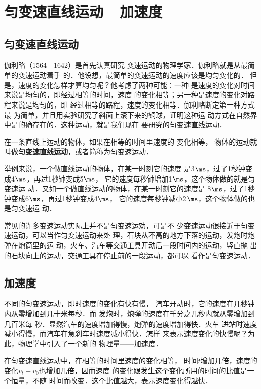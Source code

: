 \section{匀变速直线运动~~加速度}
    \subsection{匀变速直线运动}
    
    伽利略（1564—1642）是首先认真研究
变速运动的物理学家．伽利略就是从最简单的变速运动着手
的．他设想，最简单的变速运动的速度应该是均匀变化的．
但是，速度的变化怎样才算均匀呢？他考虑了两种可能：一种
是速度的变化对时间来说是均匀的，即经过相等的时间，速度
的变化相等；另一种是速度的变化对路程来说是均匀的，即
经过相等的路程，速度的变化相等．伽利略断定第一种方式最
为简单，并且用实验研究了斜面上滚下来的铜球，证明这种运
动方式在自然界中是的确存在的．这种运动，就是我们现在
要研究的匀变速直线运动．

在一条直线上运动的物体，如果在相等的时间里速度的
变化相等，
物体的运动就叫做\textbf{匀变速直线运动}，或者简称为匀变速运动．

举例来说，一个做直线运动的物体，在某一时刻它的速度
是3$\ms$，过了1秒钟变成4$\ms$，再过1秒钟变成5$\ms$，
它的速度每秒钟增加1$\ms$，这个物体做的就是匀变速运
动．又如一个做直线运动的物体，在某一时刻它的速度是
8$\ms$，过了1秒钟变成6$\ms$，再过1秒钟变成4$\ms$，
它的速度每秒钟减小2$\ms$，这个物体做的也是匀变速运
动．

    常见的许多变速运动实际上并不是匀变速运劝，可是不
少变速运动很接近于匀变速运动，可以当作匀变速运动来处
理，石块从不高的地方下落的运动，发炮时炮弹在炮筒里的运
动，火车、汽车等交通工具开动后一段时间内的运动，竖直抛
出的石块向上的运动，交通工具在停止前的一段运动，都可以
看作是匀变速运动．

\subsection{加速度}
不同的匀变速运动，即时速度的变化有快有慢，
汽车开动时，它的速度在几秒钟内从零增加到几十米每秒．而
发炮时，炮弹的速度在千分之几秒内就从零增加到几百米每
秒．显然汽车的速度增加得慢，炮弹的速度增加得快．火车
进站时速度减小得慢，而汽车在急刹车时速度减小得快．怎样
来表示速度变化的快慢呢？为此，物理学中引入了一个新的
物理量——加速度．

在匀变速直线运动中，在相等的时间里速度的变化相等，
时间$t$增加几倍，速度的变化$v_t-v_0$也增加几倍，因而速度
的变化跟发生这个变化所用的时间的比值是一个恒量，不随
时间而改变．这个比值越大，表示速度变化得越快．

